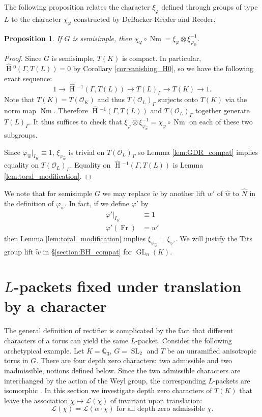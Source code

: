 \documentclass{compositio}
\theoremstyle{plain}
\newtheorem{proposition}[theorem]{Proposition}
\newcommand{\HT}[1]{\hat{\HH}{}^{#1}}
\theoremstyle{definition}
\DeclareMathOperator{\HH}{H}
\DeclareMathOperator{\Nm}{Nm}
\DeclareMathOperator{\Fr}{Fr}
\DeclareMathOperator{\GL}{GL}
\DeclareMathOperator{\SL}{SL}
\newcommand{\OK}{\mathcal{O}_K}
\newcommand{\OL}{\mathcal{O}_L}
\newcommand{\QQ}{\mathbb{Q}}
\newcommand{\Lpack}{\mathcal{L}}
\begin{document}
The following proposition relates the character $\xi_\varphi$ defined through groups of type $L$ to the character $\chi_\varphi$ constructed by DeBacker-Reeder and Reeder.

\begin{proposition}\label{prop:existenceofrectifier}
If $G$ is semisimple, then $\chi_{\varphi} \circ \Nm = \xi_{\varphi} \otimes \xi_{\varphi_{\hat{w}}}^{-1}$.
\end{proposition}

\begin{proof}
Since $G$ is semisimple, $T(K)$ is compact.  In particular,
$\HT{0}(\Gamma, T(L)) = 0$ by Corollary \ref{cor:vanishing_H0},
so we have the following exact sequence:
$$1 \rightarrow \HT{-1}(\Gamma, T(L)) \rightarrow T(L)_{\Gamma} \rightarrow T(K) \rightarrow 1.$$
Note that $T(K) = T(\OK)$ and thus
$T(\OL)_{\Gamma}$ surjects onto $T(K)$ via the norm map
$\Nm$.  Therefore $\HT{-1}(\Gamma,T(L))$ and
$T(\OL)_{\Gamma}$ together generate $T(L)_{\Gamma}$.  It thus suffices to check that
$\xi_{\varphi} \otimes \xi_{\varphi_{\hat{w}}}^{-1} = \chi_{\varphi} \circ \Nm$
on each of these two subgroups.

Since $\varphi_{\hat{w}}|_{I_K} \equiv 1$, $\xi_{\varphi_{\hat{w}}}$ is trivial on
$T(\OL)_{\Gamma}$ so Lemma
\ref{lem:GDR_compat} implies equality on $T(\OL)_{\Gamma}$.
Equality on $\HT{-1}(\Gamma,T(L))$ is Lemma \ref{lem:toral_modification}.
\end{proof}

We note that for semisimple $G$ we may replace $\tilde{w}$ by another
lift $w'$ of $\hat{w}$ to $\hat{N}$ in the definition of $\varphi_{\hat{w}}$.
In fact, if we define $\varphi'$ by
\begin{align*}
\varphi'|_{I_K} &\equiv 1 \\
\varphi'(\Fr) &= w'
\end{align*}
then Lemma \ref{lem:toral_modification} implies $\xi_{\varphi_{\hat{w}}} = \xi_{\varphi'}$.
We will justify the Tits group lift $\tilde{w}$ in \S\ref{section:BH_compat} for $\GL_n(K)$.

\section{$L$-packets fixed under translation by a character}\label{Q_T}

The general definition of rectifier is complicated by the fact that different
characters of a torus can yield the same $L$-packet.  Consider the following archetypical example.
Let $K = \QQ_3$, $G = \SL_2$ and $T$ be an unramified anisotropic torus in $G$.  There are four depth zero
characters: two admissible and two inadmissible, notions defined below.  Since the two admissible characters are interchanged
by the action of the Weyl group, the corresponding $L$-packets are isomorphic \cite[\S10]{murnaghan:11}.
In this section we investigate depth zero characters of $T(K)$ that leave the association $\chi \mapsto \Lpack(\chi)$ of \cite{reeder-debacker:09a} invariant upon translation:
$$\Lpack(\chi) = \Lpack(\alpha\cdot\chi) \mbox{ for all depth zero admissible $\chi$}.$$
\end{document}
